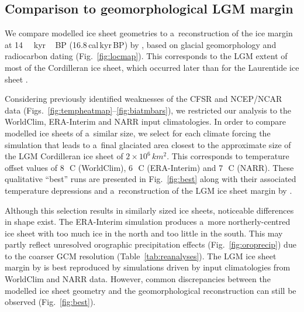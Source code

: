 \documentclass[tc, ms]{copernicus}
\begin{document}
\subsection{Comparison to geomorphological LGM margin}

We compare modelled ice sheet geometries to a~reconstruction of the ice margin at 14\,\unit{\,kyr\,BP} (16.8\,cal\,kyr\,BP) by \citet{dyke-2004}, based on glacial geomorphology and radiocarbon dating (Fig.~\ref{fig:locmap}). This corresponds to the LGM extent of most of the Cordilleran ice sheet, which occurred later than for the Laurentide ice sheet \citep{porter-swanson-1998,dyke-2004,stroeven-etal-2010,stroeven-etal-inpress}.

Considering previously identified weaknesses of the CFSR and NCEP/NCAR data (Figs.~\ref{fig:tempheatmap}--\ref{fig:biatmbars}), we restricted our analysis to the WorldClim, ERA-Interim and NARR input climatologies. In order to compare modelled ice sheets of a~similar size, we select for each climate forcing the simulation that leads to a~final glaciated area closest to the approximate size of the LGM Cordilleran ice sheet of $2\times 10^6\,\unit{km^2}$. This corresponds to temperature offset values of 8\,\unit{{\degree}C} (WorldClim), 6\,\unit{{\degree}C} (ERA-Interim) and 7\,\unit{{\degree}C} (NARR). These qualitative ``best'' runs are presented in Fig.~\ref{fig:best} along with their associated temperature depressions and a~reconstruction of the LGM ice sheet margin by \citet{dyke-2004}.

Although this selection results in similarly sized ice sheets, noticeable differences in shape exist. The ERA-Interim simulation produces a~more northerly-centred ice sheet with too much ice in the north and too little in the south. This may partly reflect unresolved orographic precipitation effects (Fig.~\ref{fig:oroprecip}) due to the coarser GCM resolution (Table~\ref{tab:reanalyses}). The LGM ice sheet margin by \citet{dyke-2004} is best reproduced by simulations driven by input climatologies from WorldClim and NARR data. However, common discrepancies between the modelled ice sheet geometry and the geomorphological reconstruction can still be observed (Fig.~\ref{fig:best}).
\end{document}
